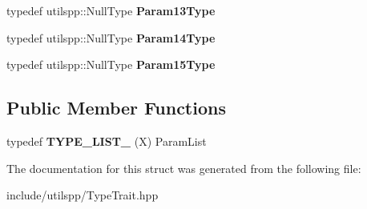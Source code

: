 \begin{DoxyCompactItemize}
\item 
\hypertarget{structutilspp_1_1PointerOnMemberFunction_3_01W_07V_1_1_5_08_07X_08_4_acee58da77266954d0357611f9acbb7a5}{typedef utilspp\-::\-Null\-Type {\bfseries Param13\-Type}}\label{structutilspp_1_1PointerOnMemberFunction_3_01W_07V_1_1_5_08_07X_08_4_acee58da77266954d0357611f9acbb7a5}

\item 
\hypertarget{structutilspp_1_1PointerOnMemberFunction_3_01W_07V_1_1_5_08_07X_08_4_ae0791de6d6946c285c707cee112354b5}{typedef utilspp\-::\-Null\-Type {\bfseries Param14\-Type}}\label{structutilspp_1_1PointerOnMemberFunction_3_01W_07V_1_1_5_08_07X_08_4_ae0791de6d6946c285c707cee112354b5}

\item 
\hypertarget{structutilspp_1_1PointerOnMemberFunction_3_01W_07V_1_1_5_08_07X_08_4_a5d4de3380f6ebe9eea0b9b8b989f68bb}{typedef utilspp\-::\-Null\-Type {\bfseries Param15\-Type}}\label{structutilspp_1_1PointerOnMemberFunction_3_01W_07V_1_1_5_08_07X_08_4_a5d4de3380f6ebe9eea0b9b8b989f68bb}

\end{DoxyCompactItemize}
\subsection*{Public Member Functions}
\begin{DoxyCompactItemize}
\item 
\hypertarget{structutilspp_1_1PointerOnMemberFunction_3_01W_07V_1_1_5_08_07X_08_4_a31a01bf6ae35fd43d5edd10455fbb402}{typedef {\bfseries T\-Y\-P\-E\-\_\-\-L\-I\-S\-T\-\_} (X) Param\-List}\label{structutilspp_1_1PointerOnMemberFunction_3_01W_07V_1_1_5_08_07X_08_4_a31a01bf6ae35fd43d5edd10455fbb402}

\end{DoxyCompactItemize}


The documentation for this struct was generated from the following file\-:\begin{DoxyCompactItemize}
\item 
include/utilspp/Type\-Trait.\-hpp\end{DoxyCompactItemize}
